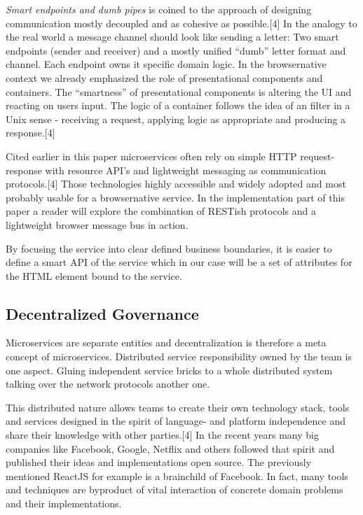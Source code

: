 \documentclass[]{article}
\begin{document}
\emph{Smart endpoints and dumb pipes} is coined to the approach of
designing communication mostly decoupled and as cohesive as
possible.{[}4{]} In the analogy to the real world a message channel
should look like sending a letter: Two smart endpoints (sender and
receiver) and a mostly unified ``dumb'' letter format and channel. Each
endpoint owns it specific domain logic. In the browsernative context we
already emphasized the role of presentational components and containers.
The ``smartness'' of presentational components is altering the UI and
reacting on users input. The logic of a container follows the idea of an
filter in a Unix sense - receiving a request, applying logic as
appropriate and producing a response.{[}4{]}

Cited earlier in this paper microservices often rely on simple HTTP
request-response with resource API's and lightweight messaging as
communication protocols.{[}4{]} Those technologies highly accessible and
widely adopted and most probably usable for a browsernative service. In
the implementation part of this paper a reader will explore the
combination of RESTish protocols and a lightweight browser message bus
in action.

By focusing the service into clear defined business boundaries, it is
easier to define a smart API of the service which in our case will be a
set of attributes for the HTML element bound to the service.

\subsection{Decentralized Governance}\label{decentralized-governance}

Microservices are separate entities and decentralization is therefore a
meta concept of microservices. Distributed service responsibility owned
by the team is one aspect. Gluing independent service bricks to a whole
distributed system talking over the network protocols another one.

This distributed nature allows teams to create their own technology
stack, tools and services designed in the spirit of language- and
platform independence and share their knowledge with other
parties.{[}4{]} In the recent years many big companies like Facebook,
Google, Netflix and others followed that spirit and published their
ideas and implementations open source. The previously mentioned ReactJS
for example is a brainchild of Facebook. In fact, many tools and
techniques are byproduct of vital interaction of concrete domain
problems and their implementations.
\end{document}
